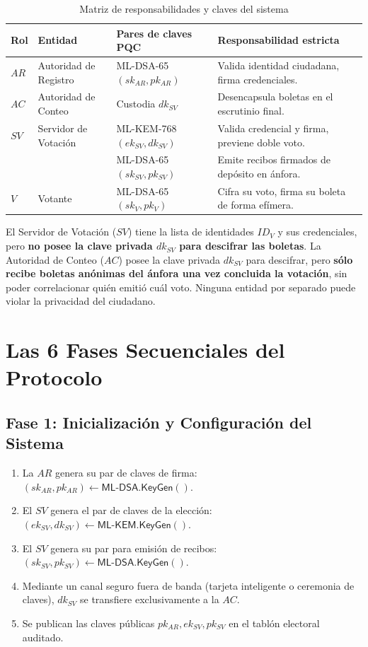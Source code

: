 \documentclass[11pt,a4paper,twoside,openright]{book}
\theoremstyle{plain}
\theoremstyle{definition}
\theoremstyle{remark}
\newcommand{\MLKEM}{\textsf{ML-KEM}}
\newcommand{\MLDSA}{\textsf{ML-DSA}}
\newcommand{\KeyGen}{\mathsf{KeyGen}}
\begin{document}
\begin{table}[H]
\centering
\caption{Matriz de responsabilidades y claves del sistema}
\label{tab:roles_claves}
\begin{tabular}{llll}
\toprule
\textbf{Rol} & \textbf{Entidad} & \textbf{Pares de claves PQC} & \textbf{Responsabilidad estricta} \\
\midrule
$AR$ & Autoridad de Registro & ML-DSA-65 $(sk_{AR}, pk_{AR})$ & Valida identidad ciudadana, firma credenciales. \\
$AC$ & Autoridad de Conteo & Custodia $dk_{SV}$ & Desencapsula boletas en el escrutinio final. \\
$SV$ & Servidor de Votaci\'on & ML-KEM-768 $(ek_{SV}, dk_{SV})$ & Valida credencial y firma, previene doble voto. \\
     & & ML-DSA-65 $(sk_{SV}, pk_{SV})$ & Emite recibos firmados de dep\'osito en \'anfora. \\
$V$  & Votante & ML-DSA-65 $(sk_V, pk_V)$ & Cifra su voto, firma su boleta de forma ef\'imera. \\
\bottomrule
\end{tabular}
\end{table}

\begin{minota}
El Servidor de Votaci\'on ($SV$) tiene la lista de identidades $ID_V$ y sus credenciales, pero \textbf{no posee la clave privada $dk_{SV}$ para descifrar las boletas}.
La Autoridad de Conteo ($AC$) posee la clave privada $dk_{SV}$ para descifrar, pero \textbf{s\'olo recibe boletas an\'onimas del \'anfora una vez concluida la votaci\'on}, sin poder correlacionar qui\'en emiti\'o cu\'al voto. Ninguna entidad por separado puede violar la privacidad del ciudadano.
\end{minota}

\section{Las 6 Fases Secuenciales del Protocolo}

\subsection{Fase 1: Inicializaci\'on y Configuraci\'on del Sistema}
\begin{enumerate}
  \item La $AR$ genera su par de claves de firma: $(sk_{AR}, pk_{AR}) \leftarrow \MLDSA.\KeyGen()$.
  \item El $SV$ genera el par de claves de la elecci\'on: $(ek_{SV}, dk_{SV}) \leftarrow \MLKEM.\KeyGen()$.
  \item El $SV$ genera su par para emisi\'on de recibos: $(sk_{SV}, pk_{SV}) \leftarrow \MLDSA.\KeyGen()$.
  \item Mediante un canal seguro fuera de banda (tarjeta inteligente o ceremonia de claves), $dk_{SV}$ se transfiere exclusivamente a la $AC$.
  \item Se publican las claves p\'ublicas $pk_{AR}, ek_{SV}, pk_{SV}$ en el tabl\'on electoral auditado.
\end{enumerate}
\end{document}
